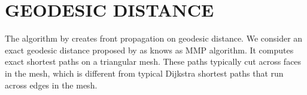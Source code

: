 \documentclass[a4paper,twoside]{article}
\begin{document}

\section{\uppercase{Geodesic Distance}}
\label{sec:geodesic distance}
\noindent The algorithm by \cite{Gu:2002:GI:566654.566589} creates front propagation on geodesic distance. We consider an exact geodesic distance proposed by \cite{Mitchell:1987:DGP:33367.33372} as knows as MMP algorithm. It computes exact shortest paths on a triangular mesh. These paths typically cut across faces in the mesh, which is different from typical Dijkstra shortest paths \cite{Dijkstra59anote} that run across edges in the mesh.
\end{document}
